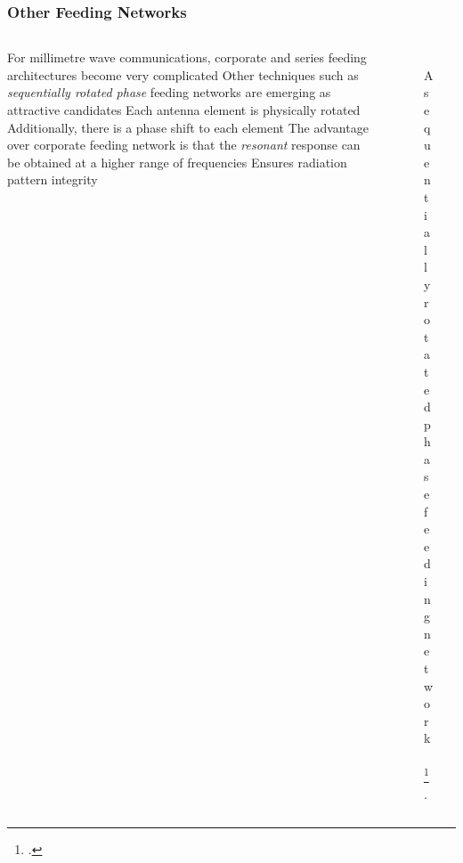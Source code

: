 \documentclass[10pt]{beamer}
\begin{document}
\begin{frame}
    \frametitle{Other Feeding Networks}
    \begin{columns}[] %
        \begin{column}{.6\textwidth}
            \begin{outline}
                \1 For millimetre wave communications, corporate and series feeding architectures become very complicated
                \1 Other techniques such as \textit{sequentially rotated phase} feeding networks are emerging as attractive candidates
                \2 Each antenna element is physically rotated
                \2 Additionally, there is a phase shift to each element
                \1 The advantage over corporate feeding network is that the \textit{resonant} response can be obtained at a higher range of frequencies
                \2 Ensures radiation pattern integrity
            \end{outline}   
        \end{column}
        \begin{column}{.4\textwidth}
            \begin{figure}[h!]
                \centering
                \includegraphics[width=.8\textwidth]{SRP.pdf}
                \caption{A sequentially rotated phase feeding network \, \footcite{ma_millimeter-wave_2019}.}
            \end{figure}
        \end{column}%
    \end{columns}
    

\end{frame}
\end{document}
